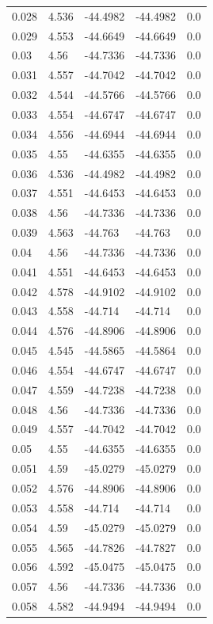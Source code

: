 \begin{table}[H]
\begin{tabular}{lllll}
0.028 & 4.536 & -44.4982 & -44.4982 & 0.0 \\
0.029 & 4.553 & -44.6649 & -44.6649 & 0.0 \\
0.03 & 4.56 & -44.7336 & -44.7336 & 0.0 \\
0.031 & 4.557 & -44.7042 & -44.7042 & 0.0 \\
0.032 & 4.544 & -44.5766 & -44.5766 & 0.0 \\
0.033 & 4.554 & -44.6747 & -44.6747 & 0.0 \\
0.034 & 4.556 & -44.6944 & -44.6944 & 0.0 \\
0.035 & 4.55 & -44.6355 & -44.6355 & 0.0 \\
0.036 & 4.536 & -44.4982 & -44.4982 & 0.0 \\
0.037 & 4.551 & -44.6453 & -44.6453 & 0.0 \\
0.038 & 4.56 & -44.7336 & -44.7336 & 0.0 \\
0.039 & 4.563 & -44.763 & -44.763 & 0.0 \\
0.04 & 4.56 & -44.7336 & -44.7336 & 0.0 \\
0.041 & 4.551 & -44.6453 & -44.6453 & 0.0 \\
0.042 & 4.578 & -44.9102 & -44.9102 & 0.0 \\
0.043 & 4.558 & -44.714 & -44.714 & 0.0 \\
0.044 & 4.576 & -44.8906 & -44.8906 & 0.0 \\
0.045 & 4.545 & -44.5865 & -44.5864 & 0.0 \\
0.046 & 4.554 & -44.6747 & -44.6747 & 0.0 \\
0.047 & 4.559 & -44.7238 & -44.7238 & 0.0 \\
0.048 & 4.56 & -44.7336 & -44.7336 & 0.0 \\
0.049 & 4.557 & -44.7042 & -44.7042 & 0.0 \\
0.05 & 4.55 & -44.6355 & -44.6355 & 0.0 \\
0.051 & 4.59 & -45.0279 & -45.0279 & 0.0 \\
0.052 & 4.576 & -44.8906 & -44.8906 & 0.0 \\
0.053 & 4.558 & -44.714 & -44.714 & 0.0 \\
0.054 & 4.59 & -45.0279 & -45.0279 & 0.0 \\
0.055 & 4.565 & -44.7826 & -44.7827 & 0.0 \\
0.056 & 4.592 & -45.0475 & -45.0475 & 0.0 \\
0.057 & 4.56 & -44.7336 & -44.7336 & 0.0 \\
0.058 & 4.582 & -44.9494 & -44.9494 & 0.0 \\

\end{tabular}
\end{table}
